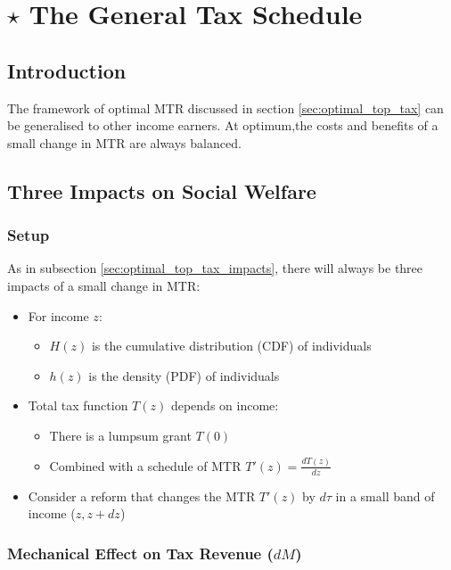 \section{$\star$ The General Tax Schedule}

    \subsection{Introduction}

        The framework of optimal MTR discussed in section \ref{sec:optimal_top_tax} can be generalised to other income earners. At optimum,the costs and benefits of a small change in MTR are always balanced.

    \subsection{Three Impacts on Social Welfare}

        \subsubsection{Setup}
        
        As in subsection \ref{sec:optimal_top_tax_impacts}, there will always be three impacts of a small change in MTR:

        \begin{itemize}
            \item For income $z$:
            \begin{itemize}
                \item $H(z)$ is the cumulative distribution (CDF) of individuals
                \item $h(z)$ is the density (PDF) of individuals
            \end{itemize}
            \item Total tax function $T(z)$ depends on income:
            \begin{itemize}
                \item There is a lumpsum grant $T(0)$
                \item Combined with a schedule of MTR $T'(z)=\frac{dT(z)}{dz}$
            \end{itemize}
            \item Consider a reform that changes the MTR $T'(z)$ by $d\tau$ in a small band of income ($z,z+dz$)
        \end{itemize}
        
        \subsubsection{Mechanical Effect on Tax Revenue ($dM$)}


